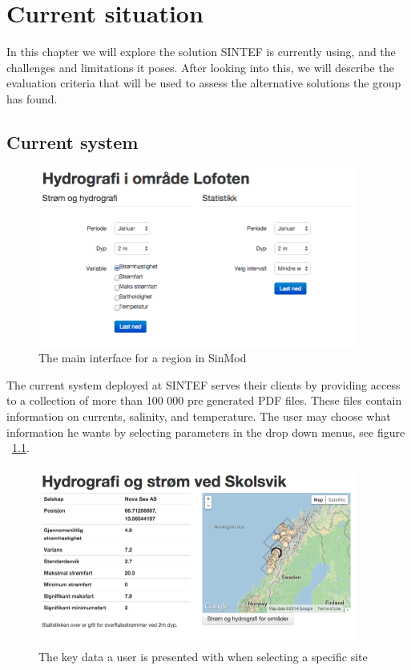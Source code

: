 \documentclass[11pt,a4paper,titlepage,oneside]{report}
\begin{document}
\chapter{Current situation}
In this chapter we will explore the solution SINTEF is currently using, and the challenges and limitations it poses. After looking into this, we will describe the evaluation criteria that will be used to assess the alternative solutions the group has found. 
\section{Current system}
\begin{figure}[h]
\begin{center}
\includegraphics[height=223px,width=396px]{img/region_interface_sinmod.png}
\caption{The main interface for a region in SinMod}
\label{fig:sinmod-region-main-interface}
\end{center}
\end{figure}

The current system deployed at SINTEF serves their clients by providing access to a collection of more than 100 000 pre generated PDF files. These files contain information on currents, salinity, and temperature. The user may choose what information he wants by selecting parameters in the drop down menus, see figure ~\ref{fig:sinmod-region-main-interface}.

\begin{figure}[h]
\begin{center}
\includegraphics[height=223px,width=396px]{img/site_key_data.png}
\caption{The key data a user is presented with when selecting a specific site}
\label{fig:sinmod-site-key-data}
\end{center}
\end{figure}
\end{document}
